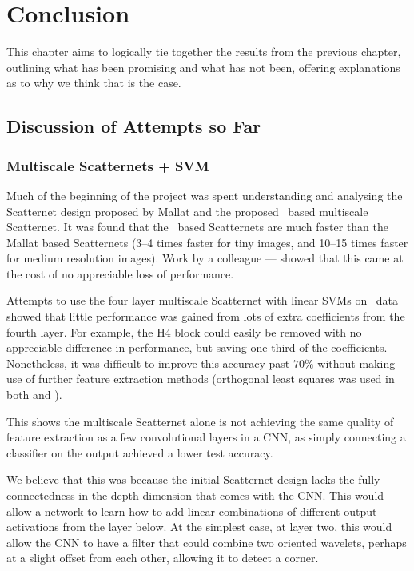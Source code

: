 \chapter{Conclusion}\label{ch:conclusion}
  This chapter aims to logically tie together the results from the previous
  chapter, outlining what has been promising and what has not been, offering
  explanations as to why we think that is the case.

\section{Discussion of Attempts so Far}
\subsection{Multiscale Scatternets + SVM}
  Much of the beginning of the project was spent understanding and analysing the
  Scatternet design proposed by Mallat and the proposed \DTCWT\ based
  multiscale Scatternet. It was found that the \DTCWT\ based Scatternets are
  much faster than the Mallat based Scatternets (3--4 times faster for tiny
  images, and 10--15 times faster for medium resolution images).
  Work by a colleague --- \citet{singh_multi-resolution_2017} showed that this
  came at the cost of no appreciable loss of performance.

  Attempts to use the four layer multiscale Scatternet with linear SVMs on
  \cifar\ data showed that little performance was gained from lots of extra
  coefficients from the fourth layer. For example, the H4 block could easily be
  removed with no appreciable difference in performance, but saving one third
  of the coefficients. Nonetheless, it was difficult to improve this accuracy
  past $70\%$ without making use of further feature extraction methods
  (orthogonal least squares was used in both \citep{oyallon_deep_2015} and
  \citep{singh_multi-resolution_2017}).

  This shows the multiscale Scatternet alone is not achieving
  the same quality of feature extraction  as
  a few convolutional layers in a CNN, as simply connecting a classifier on the
  output achieved a lower test accuracy.

  We believe that this was because the initial Scatternet design lacks the
  fully connectedness in the depth dimension that comes
  with the CNN\@. This would allow a network to learn how to add linear
  combinations of different output activations from the layer below. At the
  simplest case, at layer two, this would allow the CNN to have a filter that
  could combine two oriented wavelets, perhaps at a slight offset from each
  other, allowing it to detect a corner. 

